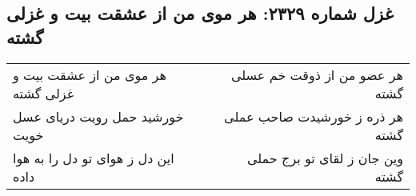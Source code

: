 \begin{center}
\section*{غزل شماره ۲۳۲۹: هر موی من از عشقت بیت و غزلی گشته}
\label{sec:2329}
\begin{longtable}{l p{0.5cm} r}
هر موی من از عشقت بیت و غزلی گشته
&&
هر عضو من از ذوقت خم عسلی گشته
\\
خورشید حمل رویت دریای عسل خویت
&&
هر ذره ز خورشیدت صاحب عملی گشته
\\
این دل ز هوای تو دل را به هوا داده
&&
وین جان ز لقای تو برج حملی گشته
\\
\end{longtable}
\end{center}
